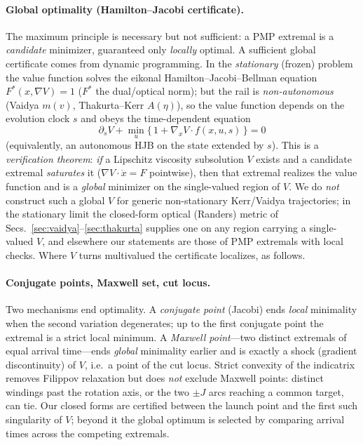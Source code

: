 \documentclass[12pt]{iopart}
\begin{document}
\paragraph{Global optimality (Hamilton--Jacobi certificate).} The maximum
principle is necessary but not sufficient: a PMP extremal is a \emph{candidate}
minimizer, guaranteed only \emph{locally} optimal. A sufficient global certificate
comes from dynamic programming. In the \emph{stationary} (frozen) problem the value
function solves the eikonal Hamilton--Jacobi--Bellman equation
$F^\ast(x,\nabla V)=1$ ($F^\ast$ the dual/optical norm); but the rail is
\emph{non-autonomous} (Vaidya $m(v)$, Thakurta--Kerr $A(\eta)$), so the value function
depends on the evolution clock $s$ and obeys the time-dependent equation
\begin{equation}
  \partial_s V+\min_{u}\big\{\,1+\nabla_x V\cdot f(x,u,s)\,\big\}=0
  \label{eq:hjb}
\end{equation}
(equivalently, an autonomous HJB on the state extended by $s$). This is a
\emph{verification theorem}: \emph{if} a Lipschitz viscosity subsolution $V$ exists
and a candidate extremal \emph{saturates} it ($\nabla V\cdot\dot x=F$ pointwise), then
that extremal realizes the value function and is a \emph{global} minimizer on the
single-valued region of $V$. We do \emph{not} construct such a global $V$ for generic
non-stationary Kerr/Vaidya trajectories; in the stationary limit the closed-form
optical (Randers) metric of Secs.~\ref{sec:vaidya}--\ref{sec:thakurta} supplies one on
any region carrying a single-valued $V$, and elsewhere our statements are those of PMP
extremals with local checks. Where $V$ turns multivalued the certificate localizes, as
follows.

\paragraph{Conjugate points, Maxwell set, cut locus.} Two mechanisms end
optimality. A \emph{conjugate point} (Jacobi) ends \emph{local} minimality when
the second variation degenerates; up to the first conjugate point the extremal is
a strict local minimum. A \emph{Maxwell point}---two distinct extremals of equal
arrival time---ends \emph{global} minimality earlier and is exactly a shock
(gradient discontinuity) of $V$, i.e.\ a point of the cut locus. Strict convexity
of the indicatrix removes Filippov relaxation but does \emph{not} exclude Maxwell
points: distinct windings past the rotation axis, or the two $\pm J$ arcs reaching
a common target, can tie. Our closed forms are certified between the launch point
and the first such singularity of $V$; beyond it the global optimum is selected by
comparing arrival times across the competing extremals.
\end{document}
